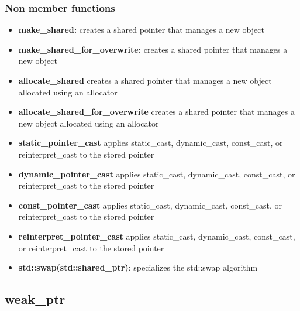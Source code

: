 \documentclass{report}
\begin{document}
        \subsubsection{Non member functions}
        \begin{itemize}
            \item \textbf{make\_shared:} creates a shared pointer that manages a new object
            \item \textbf{make\_shared\_for\_overwrite:} creates a shared pointer that manages a new object
            \item \textbf{allocate\_shared} creates a shared pointer that manages a new object allocated using an allocator
            \item \textbf{allocate\_shared\_for\_overwrite} creates a shared pointer that manages a new object allocated using an allocator
            \item \textbf{static\_pointer\_cast} applies static\_cast, dynamic\_cast, const\_cast, or reinterpret\_cast to the stored pointer
            \item \textbf{dynamic\_pointer\_cast} applies static\_cast, dynamic\_cast, const\_cast, or reinterpret\_cast to the stored pointer
            \item \textbf{const\_pointer\_cast} applies static\_cast, dynamic\_cast, const\_cast, or reinterpret\_cast to the stored pointer
            \item \textbf{reinterpret\_pointer\_cast} applies static\_cast, dynamic\_cast, const\_cast, or reinterpret\_cast to the stored pointer
            \item \textbf{std::swap(std::shared\_ptr)}: specializes the std::swap algorithm
        \end{itemize}

        \pagebreak 
        \subsection{weak\_ptr}
        \bigbreak \noindent 
\end{document}
